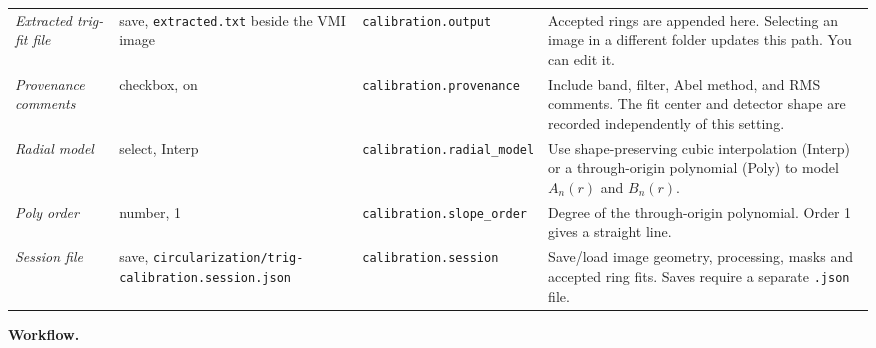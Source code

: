 \documentclass[11pt,a4paper]{article}
\newcommand{\code}[1]{\texttt{#1}}
\begin{document}
\begin{center}
\begin{longtable}{@{}L{3.6cm}L{3.1cm}L{2.9cm}L{6.3cm}@{}}
\emph{Extracted trig-fit file} & save, \code{extracted.txt} beside the VMI image &
\code{calibration.\allowbreak{}output} & Accepted rings are appended here.
Selecting an image in a different folder updates this path. You can edit it. \\
\addlinespace
\emph{Provenance comments} & checkbox, on & \code{calibration.\allowbreak{}provenance} &
Include band, filter, Abel method, and RMS comments. The fit center and
detector shape are recorded independently of this setting. \\
\addlinespace
\emph{Radial model} & select, Interp & \code{calibration.\allowbreak{}radial\_\allowbreak{}model} &
Use shape-preserving cubic interpolation (Interp) or a through-origin
polynomial (Poly) to model $A_n(r)$ and $B_n(r)$. \\
\addlinespace
\emph{Poly order} & number, 1 & \code{calibration.\allowbreak{}slope\_\allowbreak{}order} &
Degree of the through-origin polynomial. Order 1 gives a straight line. \\
\addlinespace
\emph{Session file} & save, \code{circularization/\allowbreak{}trig-\allowbreak{}calibration.\allowbreak{}session.\allowbreak{}json} &
\code{calibration.\allowbreak{}session} & Save/load image geometry, processing, masks and
accepted ring fits. Saves require a separate \code{.json} file. \\
\end{longtable}
\end{center}

\textbf{Workflow.}
\end{document}
